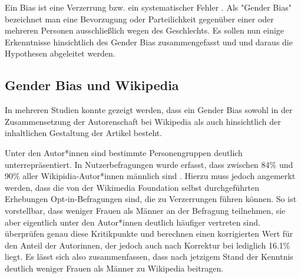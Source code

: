 \documentclass[11pt]{article}
\begin{document}
Ein Bias ist eine Verzerrung bzw. ein systematischer Fehler \parencite{Wirtz}. Als "Gender Bias" bezeichnet man eine Bevorzugung oder Parteilichkeit gegenüber einer oder mehreren Personen ausschließlich wegen des Geschlechts. Es sollen nun einige Erkenntnisse hinsichtlich des Gender Bias zusammengefasst und und daraus die Hypothesen abgeleitet werden.

\subsection {Gender Bias und Wikipedia}
In mehreren Studien konnte gezeigt werden, dass ein Gender Bias sowohl in der Zusammensetzung der Autorenschaft bei Wikipedia als auch hinsichtlich der inhaltlichen Gestaltung der Artikel besteht. 

Unter den Autor*innen sind bestimmte Personengruppen deutlich unterrepräsentiert. In Nutzerbefragungen wurde erfasst, dass zwischen 84\% und 90\% aller Wikipidia-Autor*innen männlich sind \parencite{wikimediaReport,GraellsGarrido2015}. Hierzu muss jedoch angemerkt werden, dass die von der Wikimedia Foundation selbst durchgeführten Erhebungen Opt-in-Befragungen sind, die zu Verzerrungen führen können. So ist vorstellbar, dass weniger Frauen als Männer an der Befragung teilnehmen, sie aber eigentlich unter den Autor*innen deutlich häufiger vertreten sind. \textcite{Hill2013} überprüfen genau diese Kritikpunkte und berechnen einen korrigierten Wert für den Anteil der Autorinnen, der jedoch auch nach Korrektur bei lediglich 16.1\% liegt. Es lässt sich also zusammenfassen, dass nach jetzigem Stand der Kenntnis deutlich weniger Frauen als Männer zu Wikipedia beitragen.
\end{document}
